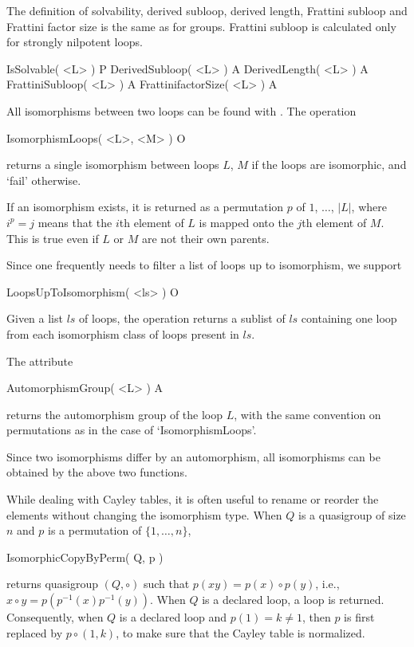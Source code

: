 The definition of solvability, derived subloop, derived length, Frattini
subloop and Frattini factor size is the same as for groups. Frattini subloop is
calculated only for strongly nilpotent loops.

\>IsSolvable( <L> ) P
\>DerivedSubloop( <L> ) A
\>DerivedLength( <L> ) A
\>FrattiniSubloop( <L> ) A
\>FrattinifactorSize( <L> ) A


All isomorphisms between two loops can be found with {\LOOPS}. The operation

\>IsomorphismLoops( <L>, <M> ) O

returns a single isomorphism between loops $L$, $M$ if the loops are
isomorphic, and `fail' otherwise.

If an isomorphism exists, it is returned as a permutation $p$ of $1$, $\dots$,
$|L|$, where $i^p=j$ means that the $i$th element of $L$ is mapped onto the
$j$th element of $M$. This is true even if $L$ or $M$ are not their own
parents.

Since one frequently needs to filter a list of loops up to isomorphism, we
support

\>LoopsUpToIsomorphism( <ls> ) O

Given a list $ls$ of loops, the operation returns a sublist of $ls$ containing
one loop from each isomorphism class of loops present in $ls$.

The attribute

\>AutomorphismGroup( <L> ) A

returns the automorphism group of the loop $L$, with the same convention on
permutations as in the case of `IsomorphismLoops'.

Since two isomorphisms differ by an automorphism, all isomorphisms can be
obtained by the above two functions.

While dealing with Cayley tables, it is often useful to rename or reorder the
elements without changing the isomorphism type. When $Q$ is a quasigroup of
size $n$ and $p$ is a permutation of $\{1,\dots,n\}$,

\>IsomorphicCopyByPerm( Q, p )

returns quasigroup $(Q,\circ)$ such that $p(xy) = p(x)\circ p(y)$, i.e.,
$x\circ y = p( p^{-1}(x)p^{-1}(y))$. When $Q$ is a declared loop, a loop is
returned. Consequently, when $Q$ is a declared loop and $p(1) = k\ne 1$, then
$p$ is first replaced by $p\circ (1,k)$, to make sure that the Cayley table is
normalized.

